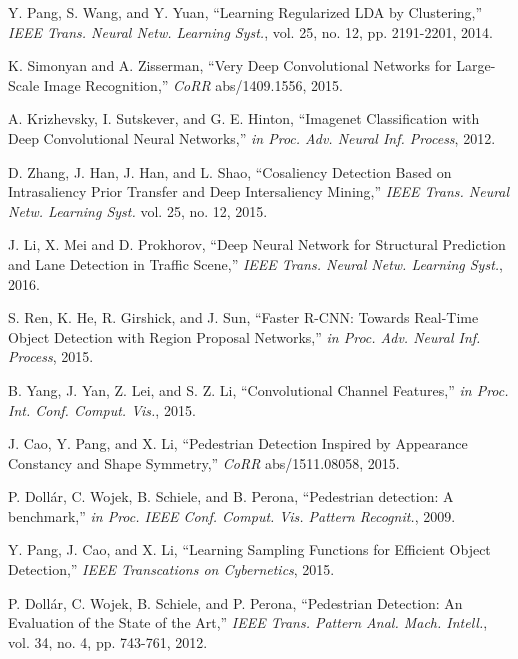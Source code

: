 \documentclass[journal]{IEEEtran}
\begin{document}
\begin{thebibliography}{1}
Y. Pang, S. Wang, and Y. Yuan, ``Learning Regularized LDA by Clustering,'' \emph{IEEE Trans. Neural Netw. Learning Syst.}, vol. 25, no. 12, pp. 2191-2201, 2014.

K. Simonyan and A. Zisserman, ``Very Deep Convolutional Networks for Large-Scale Image Recognition,''  \emph{CoRR}  abs/1409.1556, 2015.


A. Krizhevsky, I. Sutskever, and G. E. Hinton, ``Imagenet Classification with Deep Convolutional Neural Networks,'' \emph{in Proc. Adv. Neural Inf. Process}, 2012.

D. Zhang, J. Han, J. Han, and L. Shao, ``Cosaliency Detection Based on Intrasaliency Prior Transfer and Deep Intersaliency Mining,'' \emph{IEEE Trans. Neural Netw. Learning Syst.} vol. 25, no. 12, 2015.

J. Li, X. Mei and D. Prokhorov, ``Deep Neural Network for Structural Prediction and Lane Detection in Traffic Scene,'' \emph{IEEE Trans. Neural Netw. Learning Syst.}, 2016.



S. Ren, K. He, R. Girshick, and J. Sun, ``Faster R-CNN: Towards Real-Time Object Detection with Region Proposal Networks,'' \emph{in Proc. Adv. Neural Inf. Process}, 2015.

B. Yang, J. Yan, Z. Lei, and S. Z. Li, ``Convolutional Channel Features,'' \emph{in Proc. Int. Conf. Comput. Vis.}, 2015.

J. Cao, Y. Pang, and X. Li, ``Pedestrian Detection Inspired by Appearance Constancy and Shape Symmetry,''  \emph{CoRR} abs/1511.08058, 2015.

P. Doll\'{a}r, C. Wojek, B. Schiele, and B. Perona, ``Pedestrian detection: A benchmark,'' \emph{in Proc. IEEE Conf. Comput. Vis. Pattern Recognit.}, 2009.

Y. Pang, J. Cao, and X. Li, ``Learning Sampling Functions for Efficient Object Detection,'' \emph{IEEE Transcations on Cybernetics}, 2015.

P. Doll\'{a}r, C. Wojek, B. Schiele, and P. Perona, ``Pedestrian Detection: An Evaluation of the State of the Art,'' \emph{IEEE Trans. Pattern Anal. Mach. Intell.}, vol. 34, no. 4, pp. 743-761, 2012.


\end{thebibliography}
\end{document}
